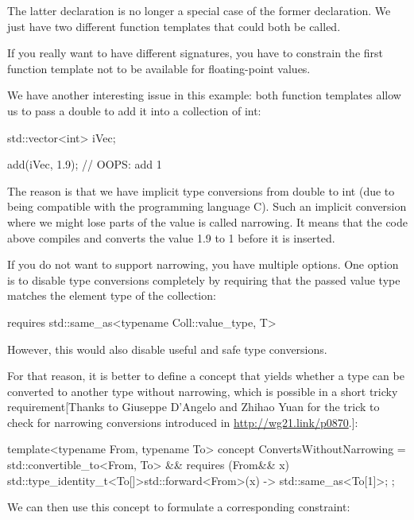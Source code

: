 The latter declaration is no longer a special case of the former declaration. We just have two different function templates that could both be called.

If you really want to have different signatures, you have to constrain the first function template not to be available for floating-point values.


We have another interesting issue in this example: both function templates allow us to pass a double to add it into a collection of int:

\begin{cpp}
std::vector<int> iVec;

add(iVec, 1.9); // OOPS: add 1
\end{cpp}

The reason is that we have implicit type conversions from double to int (due to being compatible with the programming language C). Such an implicit conversion where we might lose parts of the value is called narrowing. It means that the code above compiles and converts the value 1.9 to 1 before it is inserted.

If you do not want to support narrowing, you have multiple options. One option is to disable type conversions completely by requiring that the passed value type matches the element type of the collection:

\begin{cpp}
requires std::same_as<typename Coll::value_type, T>
\end{cpp}

However, this would also disable useful and safe type conversions.

For that reason, it is better to define a concept that yields whether a type can be converted to another type without narrowing, which is possible in a short tricky requirement[Thanks to Giuseppe D’Angelo and Zhihao Yuan for the trick to check for narrowing conversions introduced in \url{http://wg21.link/p0870}.]:

\begin{cpp}
template<typename From, typename To>
concept ConvertsWithoutNarrowing =
	std::convertible_to<From, To> &&
	requires (From&& x) {
		{ std::type_identity_t<To[]>{std::forward<From>(x)} }
		-> std::same_as<To[1]>;
	};
\end{cpp}

We can then use this concept to formulate a corresponding constraint:

